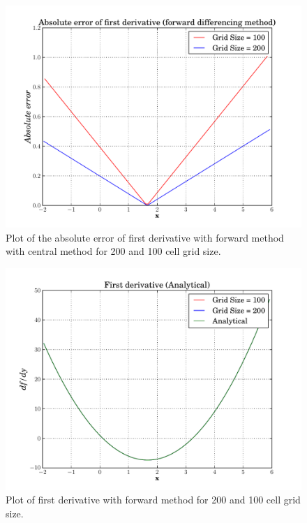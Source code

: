 \documentclass[10pt]{article}
\begin{document}
\begin{figure}[hbt]
  \begin{center}
    \includegraphics[scale=0.5]{Plots/plot2.pdf}
    \caption{\label{fig:CentralMethod} Plot of the absolute error of first derivative with forward method  with central method for 200 and 100 cell grid size.}
  \end{center}
\end{figure}

\begin{figure}[hbt]
  \begin{center}
    \includegraphics[scale=0.5]{Plots/plot3.pdf}
    \caption{\label{fig:ForwardMethoddf/dx} Plot of first derivative with forward method for 200 and 100 cell grid size.}
  \end{center}
\end{figure}
\end{document}
